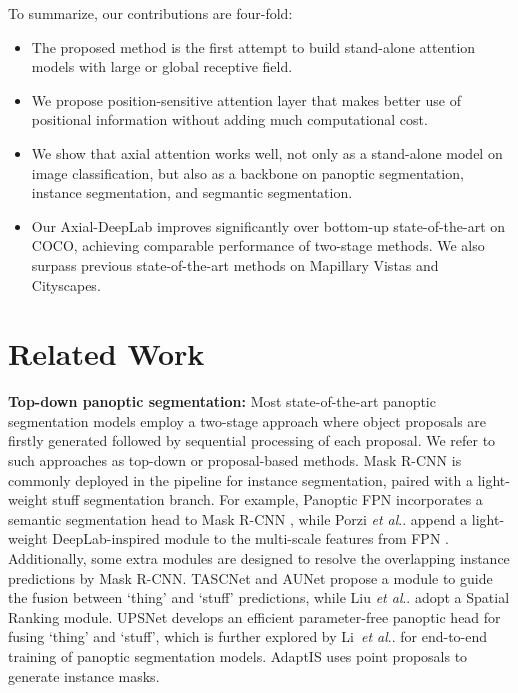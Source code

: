 \documentclass[runningheads]{llncs}
\makeatletter
\DeclareRobustCommand\onedot{\futurelet\@let@token\@onedot}
\def\@onedot{\ifx\@let@token.\else.\null\fi\xspace}
\def\etal{\emph{et al}\onedot}
\makeatother
\begin{document}
To summarize, our contributions are four-fold:
\begin{itemize}
  \item The proposed method is the first attempt to build stand-alone attention models with large or global receptive field.
  \item We propose position-sensitive attention layer that makes better use of positional information without adding much computational cost.
  \item We show that axial attention works well, not only as a stand-alone model on image classification, but also as a backbone on panoptic segmentation, instance segmentation, and segmantic segmentation.
  \item Our Axial-DeepLab improves significantly over bottom-up state-of-the-art on COCO, achieving comparable performance of two-stage methods. We also surpass previous state-of-the-art methods on Mapillary Vistas and Cityscapes.
\end{itemize}
 \section{Related Work}
\label{sec:relatedwork}
{\bf Top-down panoptic segmentation:} Most state-of-the-art panoptic segmentation models employ a two-stage approach where object proposals are firstly generated followed by sequential processing of each proposal. We refer to such approaches as top-down or proposal-based methods. Mask R-CNN \cite{he2017mask} is commonly deployed in the pipeline for instance segmentation, paired with  a light-weight stuff segmentation branch. For example, Panoptic FPN \cite{kirillov2019panoptic} incorporates a semantic segmentation head to Mask R-CNN \cite{he2017mask}, while Porzi \etal \cite{porzi2019seamless} append a light-weight DeepLab-inspired module \cite{chen2018deeplabv2} to the multi-scale features from FPN \cite{lin2017feature}. Additionally, some extra modules are designed to resolve the overlapping instance predictions by Mask R-CNN. TASCNet \cite{li2018learning} and AUNet \cite{li2018attention} propose a module to guide the fusion between `thing' and `stuff' predictions, while Liu \etal \cite{liu2019e2e} adopt a Spatial Ranking module.  UPSNet \cite{xiong2019upsnet} develops an efficient parameter-free panoptic head for fusing `thing' and `stuff', which is further explored by Li~\etal \cite{li2020unifying} for end-to-end training of panoptic segmentation models. AdaptIS \cite{sofiiuk2019adaptis} uses point proposals to generate instance masks.
\end{document}
